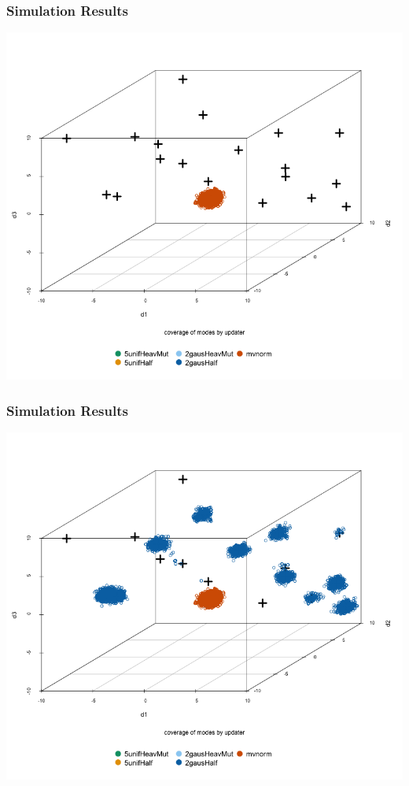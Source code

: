 \documentclass{beamer}\usepackage[]{graphicx}\usepackage[]{color}
\begin{document}
\begin{frame}
  \frametitle{Simulation Results}
  \vspace{-.6in}
  \begin{center}
      \includegraphics[scale=0.35]{figure/final_plot1.png}
  \end{center}
\end{frame}
\begin{frame}
  \frametitle{Simulation Results}
  \vspace{-.6in}
  \begin{center}
      \includegraphics[scale=0.35]{figure/final_plot2.png}
  \end{center}
\end{frame}
\end{document}
